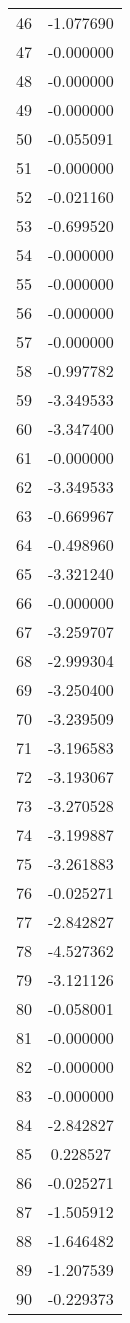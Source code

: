 \documentclass[12pt]{article}
\begin{document}
\begin{longtable}{@{}cc@{}}
46 & -1.077690 \\
47 & -0.000000 \\
48 & -0.000000 \\
49 & -0.000000 \\
50 & -0.055091 \\
51 & -0.000000 \\
52 & -0.021160 \\
53 & -0.699520 \\
54 & -0.000000 \\
55 & -0.000000 \\
56 & -0.000000 \\
57 & -0.000000 \\
58 & -0.997782 \\
59 & -3.349533 \\
60 & -3.347400 \\
61 & -0.000000 \\
62 & -3.349533 \\
63 & -0.669967 \\
64 & -0.498960 \\
65 & -3.321240 \\
66 & -0.000000 \\
67 & -3.259707 \\
68 & -2.999304 \\
69 & -3.250400 \\
70 & -3.239509 \\
71 & -3.196583 \\
72 & -3.193067 \\
73 & -3.270528 \\
74 & -3.199887 \\
75 & -3.261883 \\
76 & -0.025271 \\
77 & -2.842827 \\
78 & -4.527362 \\
79 & -3.121126 \\
80 & -0.058001 \\
81 & -0.000000 \\
82 & -0.000000 \\
83 & -0.000000 \\
84 & -2.842827 \\
85 & 0.228527 \\
86 & -0.025271 \\
87 & -1.505912 \\
88 & -1.646482 \\
89 & -1.207539 \\
90 & -0.229373 \\

\end{longtable}
\end{document}
